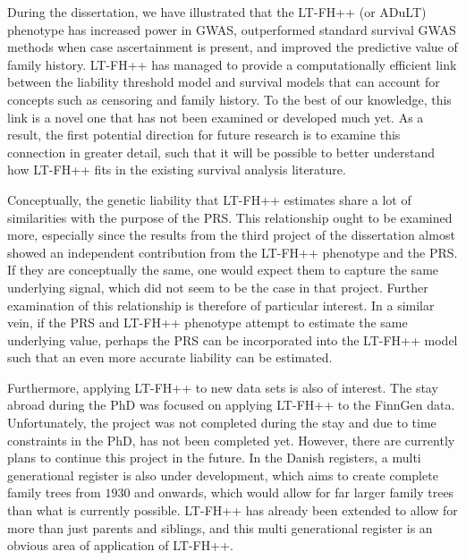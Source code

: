 During the dissertation, we have illustrated that the LT-FH++ (or ADuLT) phenotype has increased power in GWAS, outperformed standard survival GWAS methods when case ascertainment is present, and improved the predictive value of family history. LT-FH++ has managed to provide a computationally efficient link between the liability threshold model and survival models that can account for concepts such as censoring and family history. To the best of our knowledge, this link is a novel one that has not been examined or developed much yet. As a result, the first potential direction for future research is to examine this connection in greater detail, such that it will be possible to better understand how LT-FH++ fits in the existing survival analysis literature.

Conceptually, the genetic liability that LT-FH++ estimates share a lot of similarities with the purpose of the PRS. This relationship ought to be examined more, especially since the results from the third project of the dissertation almost showed an independent contribution from the LT-FH++ phenotype and the PRS. If they are conceptually the same, one would expect them to capture the same underlying signal, which did not seem to be the case in that project. Further examination of this relationship is therefore of particular interest. In a similar vein, if the PRS and LT-FH++ phenotype attempt to estimate the same underlying value, perhaps the PRS can be incorporated into the LT-FH++ model such that an even more accurate liability can be estimated.

Furthermore, applying LT-FH++ to new data sets is also of interest. The stay abroad during the PhD was focused on applying LT-FH++ to the FinnGen data. Unfortunately, the project was not completed during the stay and due to time constraints in the PhD, has not been completed yet. However, there are currently plans to continue this project in the future. In the Danish registers, a multi generational register is also under development, which aims to create complete family trees from $ 1930 $ and onwards, which would allow for far larger family trees than what is currently possible. LT-FH++ has already been extended to allow for more than just parents and siblings, and this multi generational register is an obvious area of application of LT-FH++. 


